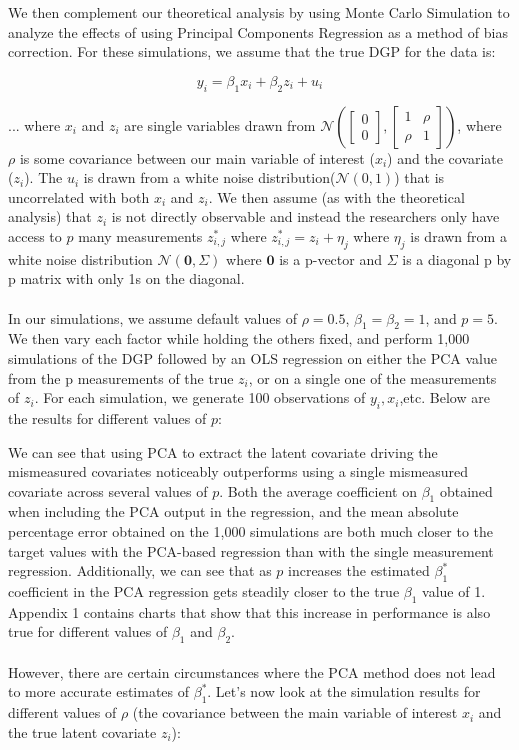 \documentclass[12pt]{article}
\begin{document}
We then complement our theoretical analysis by using Monte Carlo Simulation to analyze the effects of using Principal Components Regression as a method of bias correction. For these simulations, we assume that the true DGP for the data is:

$$y_i = \beta_1 x_i + \beta_2 z_i + u_i$$

... where $x_i$ and $z_i$ are single variables drawn from $\mathcal{N}(\begin{bmatrix} 0\\ 0 \end{bmatrix}, \begin{bmatrix} 1 & \rho\\ \rho & 1\end{bmatrix})$, where $\rho$ is some covariance between our main variable of interest ($x_i$) and the covariate ($z_i$). The $u_i$ is drawn from a white noise distribution($\mathcal{N}(0,1)$) that is uncorrelated with both $x_i$ and $z_i$. We then assume (as with the theoretical analysis) that $z_i$ is not directly observable and instead the researchers only have access to $p$ many measurements $z_{i,j}^*$ where $z_{i,j}^* = z_i + \eta_j$ where $\eta_j$ is drawn from a white noise distribution $\mathcal{N}(\mathbf{0},\Sigma)$ where $\mathbf{0}$ is a p-vector and $\Sigma$ is a diagonal p by p matrix with only 1s on the diagonal.\\
\\
In our simulations, we assume default values of $\rho = 0.5$, $\beta_1 = \beta_2 = 1$, and $p=5$. We then vary each factor while holding the others fixed, and perform 1,000 simulations of the DGP followed by an OLS regression on either the PCA value from the p measurements of the true $z_i$, or on a single one of the measurements of $z_i$. For each simulation, we generate 100 observations of $y_i,x_i$,etc. Below are the results for different values of $p$:



We can see that using PCA to extract the latent covariate driving the mismeasured covariates noticeably outperforms using a single mismeasured covariate across several values of $p$. Both the average coefficient on $\beta_1$ obtained when including the PCA output in the regression, and the mean absolute percentage error obtained on the 1,000 simulations are both much closer to the target values with the PCA-based regression than with the single measurement regression. Additionally, we can see that as $p$ increases the estimated $\beta_1^*$ coefficient in the PCA regression gets steadily closer to the true $\beta_1$ value of 1. Appendix 1 contains charts that show that this increase in performance is also true for different values of $\beta_1$ and $\beta_2$.\\
\\
However, there are certain circumstances where the PCA method does not lead to more accurate estimates of $\beta_1^*$. Let's now look at the simulation results for different values of $\rho$ (the covariance between the main variable of interest $x_i$ and the true latent covariate $z_i$):
\end{document}

